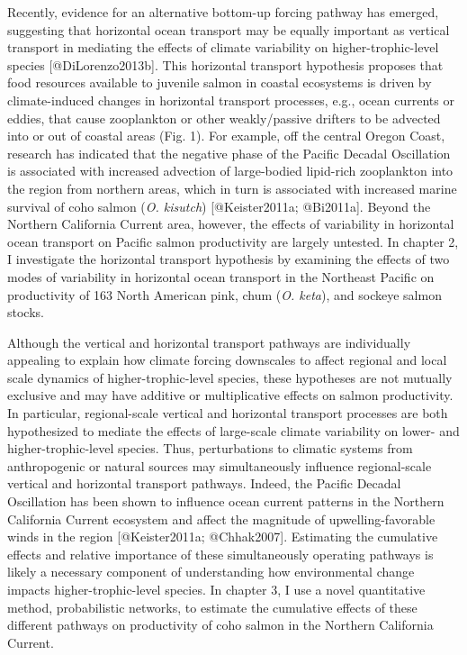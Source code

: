 Recently, evidence for an alternative bottom-up forcing pathway has
emerged, suggesting that horizontal ocean transport may be equally
important as vertical transport in mediating the effects of climate
variability on higher-trophic-level species {[}@DiLorenzo2013b{]}. This
horizontal transport hypothesis proposes that food resources available
to juvenile salmon in coastal ecosystems is driven by climate-induced
changes in horizontal transport processes, e.g., ocean currents or
eddies, that cause zooplankton or other weakly/passive drifters to be
advected into or out of coastal areas (Fig. 1). For example, off the
central Oregon Coast, research has indicated that the negative phase of
the Pacific Decadal Oscillation is associated with increased advection
of large-bodied lipid-rich zooplankton into the region from northern
areas, which in turn is associated with increased marine survival of
coho salmon (\emph{O. kisutch}) {[}@Keister2011a; @Bi2011a{]}. Beyond
the Northern California Current area, however, the effects of
variability in horizontal ocean transport on Pacific salmon productivity
are largely untested. In chapter 2, I investigate the horizontal
transport hypothesis by examining the effects of two modes of
variability in horizontal ocean transport in the Northeast Pacific on
productivity of 163 North American pink, chum (\emph{O. keta}), and
sockeye salmon stocks.

Although the vertical and horizontal transport pathways are individually
appealing to explain how climate forcing downscales to affect regional
and local scale dynamics of higher-trophic-level species, these
hypotheses are not mutually exclusive and may have additive or
multiplicative effects on salmon productivity. In particular,
regional-scale vertical and horizontal transport processes are both
hypothesized to mediate the effects of large-scale climate variability
on lower- and higher-trophic-level species. Thus, perturbations to
climatic systems from anthropogenic or natural sources may
simultaneously influence regional-scale vertical and horizontal
transport pathways. Indeed, the Pacific Decadal Oscillation has been
shown to influence ocean current patterns in the Northern California
Current ecosystem and affect the magnitude of upwelling-favorable winds
in the region {[}@Keister2011a; @Chhak2007{]}. Estimating the cumulative
effects and relative importance of these simultaneously operating
pathways is likely a necessary component of understanding how
environmental change impacts higher-trophic-level species. In chapter 3,
I use a novel quantitative method, probabilistic networks, to estimate
the cumulative effects of these different pathways on productivity of
coho salmon in the Northern California Current.


